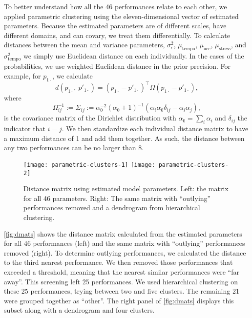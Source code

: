 \documentclass[12pt]{article}
\begin{document}
To better understand how all the 46 performances relate to each other,
we applied parametric clustering using the eleven-dimensional vector
of estimated parameters. Because the estimated parameters are of
different scales, have different domains, and can covary, we treat
them differentially. To calculate distances between the mean and
variance parameters, $\sigma^2_\epsilon$, $\mu_{\textrm{tempo}}$,
$\mu_{\textrm{acc}}$, $\mu_{\textrm{stress}}$, and
$\sigma^2_{\textrm{tempo}}$ we simply use Euclidean distance on each
individually. In the cases of the probabilities, we use weighted
Euclidean distance in the prior precision. For example, for
$p_{1\cdot}$, we calculate
\begin{equation}
d\left(p_{1\cdot},\ p'_{1\cdot}\right) = (p_{1\cdot}-p'_{1\cdot})^\top
  \Omega (p_{1\cdot}-p'_{1\cdot}),
\end{equation}
where
\begin{equation}
  \Omega^{-1}_{ij} := \Sigma_{ij} :=
  \alpha_0^{-2}(\alpha_0+1)^{-1}\left(\alpha_i\alpha_0 \delta_{ij}
    - \alpha_i\alpha_j\right),
\end{equation}
is the covariance matrix of the Dirichlet distribution with
$\alpha_0=\sum_i\alpha_i$ and $\delta_{ij}$ the indicator that
$i=j$. We then standardize each individual distance matrix to have a
maximum distance of 1 and add them together. As such, the distance
between any two performances can be no larger than 8.


\begin{figure}[t]
  \centering
  \texttt{[image: parametric-clusters-1]}
  \texttt{[image: parametric-clusters-2]}
  \caption{Distance matrix using estimated model parameters. Left: the
    matrix for all 46 parameters. Right: The same matrix with
    ``outlying'' performances removed and a dendrogram from hierarchical
    clustering.}
  \label{fig:dmats}
\end{figure}
\autoref{fig:dmats} shows the distance matrix calculated from the
estimated parameters for all 46 performances (left) and the same
matrix with ``outlying'' performances removed (right). To determine
outlying performances, we calculated the distance to the third nearest
performance. We then removed those performances that exceeded a
threshold, meaning that the nearest similar performances were ``far
away''. This screening left 25 performances. We used hierarchical
clustering on these 25 performances, trying between two and five
clusters. The remaining 21 were grouped together as ``other''. The
right panel of \autoref{fig:dmats} displays this subset along with a
dendrogram and four clusters.
\end{document}
